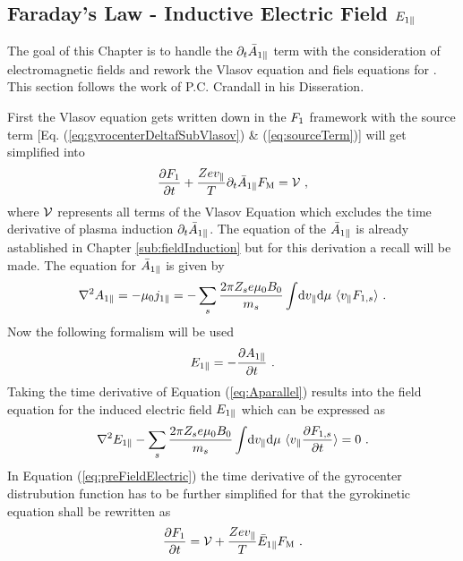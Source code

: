 \subsection{Faraday's Law - Inductive Electric Field $E_{1\parallel}$}
\label{sub:fieldEpar}

The goal of this Chapter is to handle the $\partial_t \bar{A}_{1\parallel}$ term with the consideration of electromagnetic fields and rework the Vlasov equation and fiels equations for \gkw. This section follows the work of P.C. Crandall in his Disseration\cite{Crandall_PHD}.
\bigskip

First the Vlasov equation gets written down in the $F_1$ framework with the source term [Eq. (\ref{eq:gyrocenterDeltafSubVlasov}) \& (\ref{eq:sourceTerm})] will get simplified into 
\begin{gather}
    \frac{\partial F_1}{\partial t} + \frac{Ze v_\parallel}{T} \partial_t \bar{A}_{1\parallel} F_\mathrm{M} = \mathcal{V}~,
    \label{eq:gyrocenterDeltafSubVlasovReduced}
\end{gather}
where $\mathcal{V}$ represents all terms of the Vlasov Equation which excludes the time derivative of plasma induction $\partial_t \bar{A}_{1\parallel}$. The equation of the $\bar{A}_{1\parallel}$ is already astablished in Chapter \ref{sub:fieldInduction} but for this derivation a recall will be made. The equation for $\bar{A}_{1\parallel}$ is given by
\begin{gather}
    \nabla^2 A_{1\parallel} = - \mu_0 j_{1\parallel} = - \sum_s \frac{2\pi Z_se \mu_0 B_0}{m_s} \int \! \mathrm{d}v_\parallel\mathrm{d}\mu ~ \langle v_\parallel F_{1,s}\rangle~.
    \label{eq:Aparallel}
\end{gather}
Now the following formalism will be used
\begin{gather}
	E_{1\parallel} = - \frac{\partial A_{1\parallel}}{\partial t}~.
	\label{eq:faradayLaw}
\end{gather}
Taking the time derivative of Equation (\ref{eq:Aparallel}) results into the field equation for the induced electric field $
E_{1\parallel}$ which can be expressed as
\begin{gather}
	\nabla^2 E_{1\parallel} - \sum_s \frac{2\pi Z_se \mu_0 B_0}{m_s} \int \! \mathrm{d}v_\parallel\mathrm{d}\mu ~ \langle v_\parallel \frac{\partial F_{1,s}}{\partial t}\rangle = 0 ~.
	\label{eq:preFieldElectric}
\end{gather}
In Equation (\ref{eq:preFieldElectric}) the time derivative of the gyrocenter distrubution function has to be further simplified for that the gyrokinetic equation shall be rewritten as 
\begin{gather}
	\frac{\partial F_1}{\partial t} = \mathcal{V} + \frac{Ze v_\parallel}{T} \bar{E}_{1\parallel} F_\mathrm{M}~.
	\label{eq:gyrocenterDeltafSubVlasovReducedIndElectric}
\end{gather}
